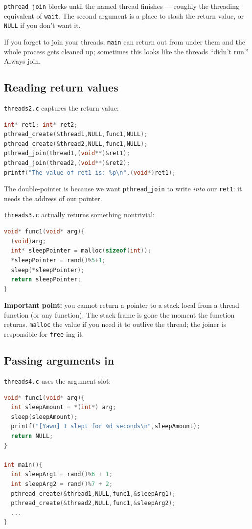 \documentclass[11pt]{article}
\begin{document}
\texttt{pthread\_join} blocks until the named thread finishes ---
roughly the threading equivalent of \texttt{wait}. The second
argument is a place to stash the return value, or \texttt{NULL} if
you don't want it.

If you forget to join your threads, \texttt{main} can return out
from under them and the whole process gets cleaned up; sometimes
this looks like the threads ``didn't run.'' Always join.

\subsection*{Reading return values}

\texttt{threads2.c} captures the return value:

\begin{lstlisting}[language=C]
int* ret1; int* ret2;
pthread_create(&thread1,NULL,func1,NULL);
pthread_create(&thread2,NULL,func1,NULL);
pthread_join(thread1,(void**)&ret1);
pthread_join(thread2,(void**)&ret2);
printf("The value of ret1 is: %p\n",(void*)ret1);
\end{lstlisting}

The double-pointer is because we want \texttt{pthread\_join} to
write \emph{into} our \texttt{ret1}: it needs the address of our
pointer.

\texttt{threads3.c} actually returns something nontrivial:

\begin{lstlisting}[language=C]
void* func1(void* arg){
  (void)arg;
  int* sleepPointer = malloc(sizeof(int));
  *sleepPointer = rand()%5+1;
  sleep(*sleepPointer);
  return sleepPointer;
}
\end{lstlisting}

\textbf{Important point:} you cannot return a pointer to a stack
local from a thread function (or any function). The stack frame is
gone the moment the function returns. \texttt{malloc} the value if
you need it to outlive the thread; the joiner is responsible for
\texttt{free}-ing it.

\subsection*{Passing arguments in}

\texttt{threads4.c} uses the argument slot:

\begin{lstlisting}[language=C]
void* func1(void* arg){
  int sleepAmount = *(int*) arg;
  sleep(sleepAmount);
  printf("[Yawn] I slept for %d seconds\n",sleepAmount);
  return NULL;
}

int main(){
  int sleepArg1 = rand()%6 + 1;
  int sleepArg2 = rand()%7 + 2;
  pthread_create(&thread1,NULL,func1,&sleepArg1);
  pthread_create(&thread2,NULL,func1,&sleepArg2);
  ...
}
\end{lstlisting}
\end{document}
